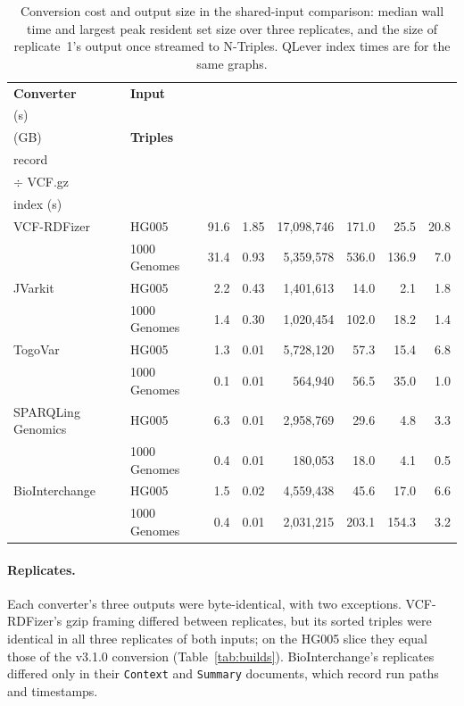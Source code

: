 \documentclass[11pt]{article}
\begin{document}
\begin{table}[!htbp]
\caption{Conversion cost and output size in the shared-input comparison: median wall time and largest peak resident set size over three replicates, and the size of replicate~1's output once streamed to N-Triples. QLever index times are for the same graphs.}\label{tab:converters-cost}%
\centering\footnotesize\setlength{\tabcolsep}{0pt}\renewcommand{\arraystretch}{1.1}%
\newcommand{\hd}[1]{\textbf{\begin{tabular}[b]{@{}c@{}}#1\end{tabular}}}%
\begin{tabular*}{\textwidth}{@{\extracolsep{\fill}}llrrrrrr@{}}
\toprule
\textbf{Converter} & \textbf{Input} & \hd{Wall\\(s)} & \hd{Peak RSS\\(GB)} & \textbf{Triples} & \hd{Triples per\\record} & \hd{N-Triples.gz\\$\div$ VCF.gz} & \hd{QLever\\index (s)}\\
\midrule
VCF-RDFizer & HG005 & 91.6 & 1.85 & 17,098,746 & 171.0 & 25.5 & 20.8\\
 & 1000 Genomes & 31.4 & 0.93 & 5,359,578 & 536.0 & 136.9 & 7.0\\
JVarkit & HG005 & 2.2 & 0.43 & 1,401,613 & 14.0 & 2.1 & 1.8\\
 & 1000 Genomes & 1.4 & 0.30 & 1,020,454 & 102.0 & 18.2 & 1.4\\
TogoVar & HG005 & 1.3 & 0.01 & 5,728,120 & 57.3 & 15.4 & 6.8\\
 & 1000 Genomes & 0.1 & 0.01 & 564,940 & 56.5 & 35.0 & 1.0\\
SPARQLing Genomics & HG005 & 6.3 & 0.01 & 2,958,769 & 29.6 & 4.8 & 3.3\\
 & 1000 Genomes & 0.4 & 0.01 & 180,053 & 18.0 & 4.1 & 0.5\\
BioInterchange & HG005 & 1.5 & 0.02 & 4,559,438 & 45.6 & 17.0 & 6.6\\
 & 1000 Genomes & 0.4 & 0.01 & 2,031,215 & 203.1 & 154.3 & 3.2\\
\bottomrule
\end{tabular*}
\end{table}

\paragraph{Replicates.}
Each converter's three outputs were byte-identical, with two exceptions.
VCF-RDFizer's gzip framing differed between replicates, but its sorted triples were identical in all three replicates of both inputs; on the HG005 slice they equal those of the v3.1.0 conversion (Table~\ref{tab:builds}).
BioInterchange's replicates differed only in their \texttt{Context} and \texttt{Summary} documents, which record run paths and timestamps.
\end{document}

